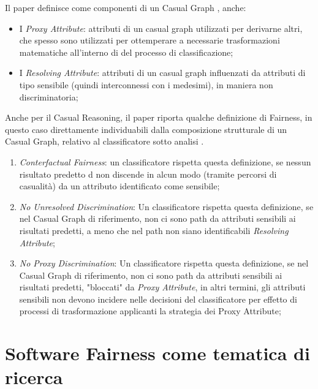  Il paper definisce come componenti di un Casual Graph \cite{FairnessDefinitionExplained}, anche:
 \begin{itemize}
     \item I \emph{Proxy Attribute}: attributi di un casual graph utilizzati per derivarne altri, che spesso sono utilizzati per ottemperare a necessarie trasformazioni matematiche all'interno di del processo di classificazione;
     \item I \emph{Resolving Attribute}: attributi di un casual graph influenzati da  attributi di tipo sensibile (quindi interconnessi con i medesimi), in maniera non discriminatoria;
 \end{itemize}
 
 Anche per il Casual Reasoning, il paper riporta qualche definizione di Fairness, in questo caso direttamente individuabili dalla composizione strutturale di un Casual Graph, relativo al classificatore sotto analisi \cite{FairnessDefinitionExplained}.
 
 \begin{enumerate}
     \item \emph{Conterfactual Fairness}: un classificatore rispetta questa definizione, se nessun risultato predetto d non discende in alcun modo (tramite percorsi di casualità) da un attributo identificato come sensibile;
     \item \emph{No Unresolved Discrimination}: Un classificatore rispetta questa definizione, se nel Casual Graph di riferimento, non ci sono path da attributi sensibili ai risultati predetti, a meno che nel path non siano identificabili \textit{Resolving Attribute};
     \item \emph{No Proxy Discrimination}: Un classificatore rispetta questa definizione, se nel Casual Graph di riferimento, non ci sono path da attributi sensibili ai risultati predetti, "bloccati" da \textit{Proxy Attribute}, in altri termini, gli attributi sensibili non devono incidere nelle decisioni del classificatore per effetto di processi di trasformazione applicanti la strategia dei Proxy Attribute;
 \end{enumerate}






\newpage
\section{Software Fairness come tematica di ricerca}



